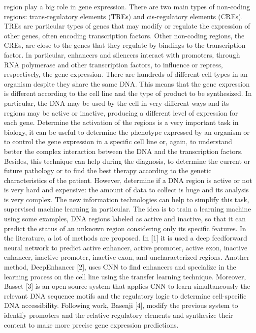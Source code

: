 region play a big role in gene expression. There are two main types of
non-coding regions: trans-regulatory elements (TREs) and cis-regulatory
elements (CREs). TREs are particular types of genes that may modify or
regulate the expression of other genes, often encoding transcription
factors. Other non-coding regions, the CREs, are close to the genes that
they regulate by bindings to the transcription factor. In particular,
enhancers and silencers interact with promoters, through RNA polymerase
and other transcription factors, to influence or repress, respectively,
the gene expression. There are hundreds of different cell types in an
organism despite they share the same DNA. This means that the gene
expression is different according to the cell line and the type of
product to be synthesized. In particular, the DNA may be used by the
cell in very different ways and its regions may be active or inactive,
producing a different level of expression for each gene. Determine the
activation of the regions is a very important task in biology, it can be
useful to determine the phenotype expressed by an organism or to control
the gene expression in a specific cell line or, again, to understand
better the complex interaction between the DNA and the transcription
factors. Besides, this technique can help during the diagnosis, to
determine the current or future pathology or to find the best therapy
according to the genetic characteristics of the patient. However,
determine if a DNA region is active or not is very hard and expensive:
the amount of data to collect is huge and its analysis is very complex.
The new information technologies can help to simplify this task,
supervised machine learning in particular. The idea is to train a
learning machine using some examples, DNA regions labeled as active and
inactive, so that it can predict the status of an unknown region
considering only its specific features. In the literature, a lot of
methods are proposed. In {[}1{]} it is used a deep feedforward neural
network to predict active enhancer, active promoter, active exon,
inactive enhancer, inactive promoter, inactive exon, and uncharacterized
regions. Another method, DeepEnhancer {[}2{]}, uses CNN to find
enhancers and specialize in the learning process on the cell line using
the transfer learning technique. Moreover, Basset {[}3{]} is an
open-source system that applies CNN to learn simultaneously the relevant
DNA sequence motifs and the regulatory logic to determine cell-specific
DNA accessibility. Following work, Basenji {[}4{]}, modify the previous
system to identify promoters and the relative regulatory elements and
synthesize their content to make more precise gene expression
predictions.